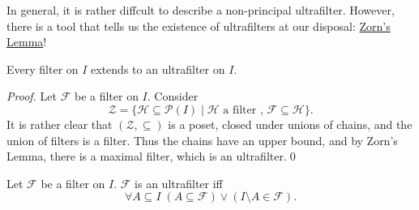 \documentclass[notoc,notitlepage]{tufte-book}
\begin{document}
In general, it is rather diffcult to describe a non-principal ultrafilter. However, there is a tool that tells us the existence of ultrafilters at our disposal: \hyperref[item:zorn_s_lemma]{Zorn's Lemma}!

\begin{lemma}\label{lemma:existence_of_ultrafilters}
  Every filter on $I$ extends to an ultrafilter on $I$.
\end{lemma}

\begin{proof}
  Let $\mathcal{F}$ be a filter on $I$. Consider
  \begin{equation*}
    \mathcal{Z} = \{ \mathcal{H} \subseteq \mathcal{P}(I) \mid \mathcal{H} \text{ a filter }, \, \mathcal{F} \subseteq \mathcal{H} \}.
  \end{equation*}
  It is rather clear that $(\mathcal{Z}, \subseteq)$ is a poset, closed under unions of chains, and the union of filters is a filter. Thus the chains have an upper bound, and by Zorn's Lemma, there is a maximal filter, which is an ultrafilter.\qed\
\end{proof}

\begin{lemma}\label{lemma:equivalent_characterization_of_an_ultrafilter}
  Let $\mathcal{F}$ be a filter on $I$. $\mathcal{F}$ is an ultrafilter iff
  \begin{equation*}
    \forall A \subseteq I \; (A \subseteq \mathcal{F}) \lor (I \setminus A \in \mathcal{F}).
  \end{equation*}
\end{lemma}
\end{document}
